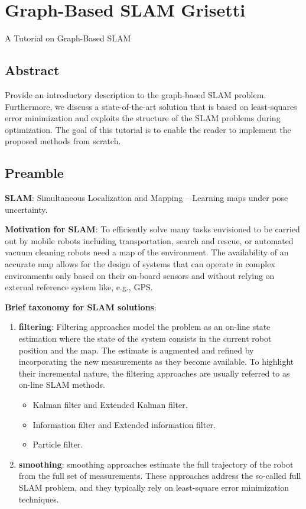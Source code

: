 \chapter{Graph-Based SLAM  Grisetti}
{\large A Tutorial on Graph-Based SLAM}

\section{Abstract}
Provide an introductory description to the graph-based SLAM problem. Furthermore, we discuss a state-of-the-art solution that is based on least-squares error minimization and exploits the structure of the SLAM problems during optimization. The goal of this tutorial is to enable the reader to implement the proposed methods from scratch. 

\section{Preamble}
\textbf{SLAM}: Simultaneous Localization and Mapping -- Learning maps under pose uncertainty.

\textbf{Motivation for SLAM}: To efficiently solve many tasks envisioned to be carried out by mobile robots including transportation, search and rescue, or automated vacuum cleaning robots need a map of the environment. The availability of an accurate map allows for the design of systems that can operate in complex environments only based on their on-board sensors and without relying on external reference system like, e.g., GPS.

\textbf{Brief taxonomy for SLAM solutions}:
\begin{enumerate}
    \item \textbf{filtering}: Filtering approaches model the problem as an on-line state estimation where the state of the system consists in the current robot position and the map. The estimate is augmented and refined by incorporating the new measurements as they become available. To highlight their incremental nature, the filtering approaches are usually referred to as on-line SLAM methods.
    \begin{itemize}
        \item Kalman filter and Extended Kalman filter.
        \item Information filter and Extended information filter.
        \item Particle filter.
    \end{itemize}
    \item \textbf{smoothing}: smoothing approaches estimate the full trajectory of the robot from the full set of measurements. These approaches address the so-called full SLAM problem, and they typically rely on least-square error minimization techniques.
\end{enumerate}

